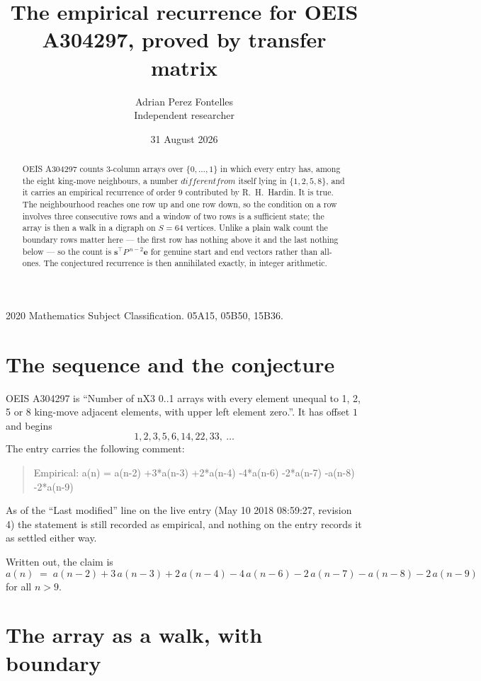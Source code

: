 \documentclass[11pt,a4paper]{article}
\title{The empirical recurrence for OEIS A304297, proved by transfer matrix}
\author{Adrian Perez Fontelles\\ \small Independent researcher}
\date{31 August 2026}
\theoremstyle{plain}
\theoremstyle{definition}
\begin{document}
\maketitle

\begin{abstract}
OEIS A304297 counts $3$-column arrays over $\{0,\dots,1\}$ in which every entry has,
among the eight king-move neighbours, a number $different from$ itself lying in $\{1,2,5,8\}$, and it carries an empirical
recurrence of order $9$ contributed by R.~H.~Hardin. It is true. The neighbourhood
reaches one row up and one row down, so the condition on a row involves three consecutive
rows and a window of two rows is a sufficient state; the array is then a walk in a digraph
on $S=64$ vertices. Unlike a plain walk count the boundary rows matter here --- the first
row has nothing above it and the last nothing below --- so the count is
$\mathbf{s}^{\!\top}P^{\,n-2}\mathbf{e}$ for genuine start and end vectors rather than
all-ones. The conjectured recurrence is then annihilated exactly, in integer arithmetic.
\end{abstract}

\noindent\small 2020 Mathematics Subject Classification. 05A15, 05B50, 15B36.\normalsize

\section{The sequence and the conjecture}

OEIS A304297 is ``Number of nX3 0..1 arrays with every element unequal to 1, 2, 5 or 8 king-move adjacent elements, with upper left element zero.''. It has offset
$1$ and begins
\[
1, 2, 3, 5, 6, 14, 22, 33,\ \dots
\]
The entry carries the following comment:
\begin{quote}\small
Empirical: a(n) = a(n-2) +3*a(n-3) +2*a(n-4) -4*a(n-6) -2*a(n-7) -a(n-8) -2*a(n-9)
\end{quote}
As of the ``Last modified'' line on the live entry (May 10 2018 08:59:27, revision
4) the statement is still recorded as empirical, and nothing on the entry
records it as settled either way.

Written out, the claim is
\begin{equation}\label{eq:conj}
a(n)\;=\;a(n-2) + 3\,a(n-3) + 2\,a(n-4) - 4\,a(n-6) - 2\,a(n-7) - a(n-8) - 2\,a(n-9)
\end{equation}
for all $n>9$.

\section{The array as a walk, with boundary}
\end{document}
